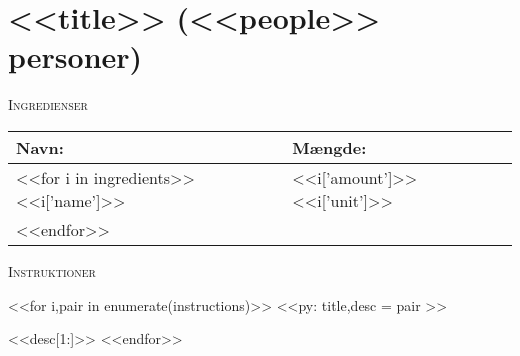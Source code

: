 \section{<<title>> (<<people>> personer)}


\begin{center}
\textsc{Ingredienser}

\begin{tabular}{|p{4cm}|p{4cm}|}
  \hline
  \bf{Navn:} & \bf{Mængde:} \\
  \hline\hline

  <<for i in ingredients>>
    <<i['name']>> & <<i['amount']>> <<i['unit']>> \\ \hline
  <<endfor>>

  \hline
\end{tabular}

\vspace{.5cm}

\textsc{Instruktioner}\\
\begin{description}
<<for i,pair in enumerate(instructions)>>
  <<py: title,desc = pair >>
  \item[<<i>>. <<title>>] <<desc[1:]>>
<<endfor>>
\end{description}

\end{center}

